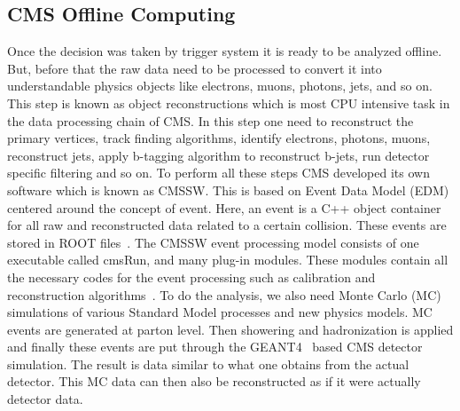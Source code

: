 \subsection{CMS Offline Computing} %
\label{sub:cms_offline_computing}
Once the decision was taken by trigger system it is ready to be analyzed offline. But, before that the raw data need to be processed to convert it into understandable physics objects like electrons, muons, photons, jets, and so on. This step is known as object reconstructions which is most CPU intensive task in the data processing chain of CMS. In this step one need to reconstruct the primary vertices, track finding algorithms, identify electrons, photons, muons, reconstruct jets, apply b-tagging algorithm to reconstruct b-jets, run detector specific filtering and so on.
To perform all these steps CMS developed its own software which is known as CMSSW. This is based on Event Data Model (EDM) centered around the concept of event. Here, an event is a C++ object container for all raw and reconstructed data related to a certain collision. These events are stored in ROOT files~\cite{Root1996}. The CMSSW event processing model consists of one executable called cmsRun, and many plug-in modules. These modules contain all the necessary codes for the event processing such as calibration and reconstruction algorithms~\cite{Bayatyan2005}.
To do the analysis, we also need Monte Carlo (MC) simulations of various Standard Model processes and new physics models. MC events are generated at parton level. Then showering and hadronization is applied and finally these events are put through the GEANT4~\cite{Agostinelli2003} based CMS detector simulation. The result is data similar to what one obtains from the actual detector. This MC data can then also be reconstructed as if it were actually detector data.















